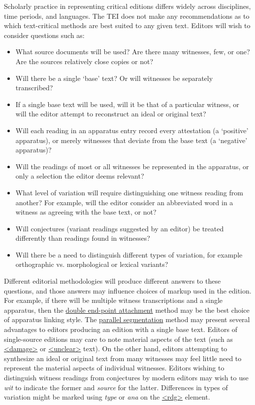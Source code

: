 Scholarly practice in representing critical editions differs widely across disciplines, time periods, and languages. The TEI does not make any recommendations as to which text-critical methods are best suited to any given text. Editors will wish to consider questions such as: \begin{itemize}
\item What source documents will be used? Are there many witnesses, few, or one? Are the sources relatively close copies or not?
\item Will there be a single ‘base’ text? Or will witnesses be separately transcribed?
\item If a single base text will be used, will it be that of a particular witness, or will the editor attempt to reconstruct an ideal or original text?
\item Will each reading in an apparatus entry record every attestation (a ‘positive’ apparatus), or merely witnesses that deviate from the base text (a ‘negative’ apparatus)?
\item Will the readings of most or all witnesses be represented in the apparatus, or only a selection the editor deems relevant?
\item What level of variation will require distinguishing one witness reading from another? For example, will the editor consider an abbreviated word in a witness as agreeing with the base text, or not?
\item Will conjectures (variant readings suggested by an editor) be treated differently than readings found in witnesses?
\item Will there be a need to distinguish different types of variation, for example orthographic vs. morphological or lexical variants?
\end{itemize} \par
Different editorial methodologies will produce different answers to these questions, and those answers may influence choices of markup used in the edition. For example, if there will be multiple witness transcriptions and a single apparatus, then the \hyperref[TCAPDE]{double end-point attachment} method may be the best choice of apparatus linking style. The \hyperref[TCAPPS]{parallel segmentation} method may present several advantages to editors producing an edition with a single base text. Editors of single-source editions may care to note material aspects of the text (such as \hyperref[TEI.damage]{<damage>} or \hyperref[TEI.unclear]{<unclear>} text). On the other hand, editors attempting to synthesize an ideal or original text from many witnesses may feel little need to represent the material aspects of individual witnesses. Editors wishing to distinguish witness readings from conjectures by modern editors may wish to use {\itshape wit} to indicate the former and {\itshape source} for the latter. Differences in types of variation might be marked using {\itshape type} or {\itshape ana} on the \hyperref[TEI.rdg]{<rdg>} element.\par
